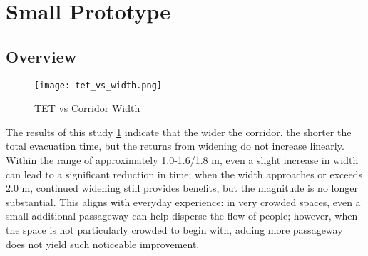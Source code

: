 \section{Small Prototype}

\subsection{Overview}
\begin{figure}[h]
    \centering
    \texttt{[image: tet\_vs\_width.png]}
    \caption{TET vs Corridor Width}
    \label{fig:tet_vs_width}
\end{figure}
The results of this study \ref{fig:tet_vs_width} indicate that the wider the corridor, the shorter the total evacuation time, but the returns from widening do not increase linearly. Within the range of approximately 1.0-1.6/1.8 m, even a slight increase in width can lead to a significant reduction in time; when the width approaches or exceeds 2.0 m, continued widening still provides benefits, but the magnitude is no longer substantial. This aligns with everyday experience: in very crowded spaces, even a small additional passageway can help disperse the flow of people; however, when the space is not particularly crowded to begin with, adding more passageway does not yield such noticeable improvement.

